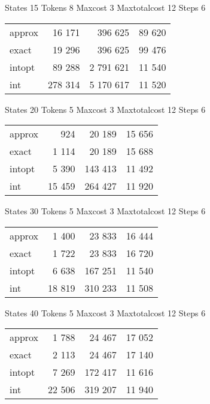 \documentclass[a4paper,11pt]{article}
\begin{document}
\begin{table}
States 15 Tokens 8 Maxcost 3 Maxtotalcost 12 Steps 6 \\
\begin{tabular}{l r r r}
approx & 16 171 & 396 625 & 89 620 \\
exact & 19 296 & 396 625 & 99 476 \\
intopt & 89 288 & 2 791 621 & 11 540 \\
int & 278 314 & 5 170 617 & 11 520 \\
\end{tabular}
\end{table}

\begin{table}
States 20 Tokens 5 Maxcost 3 Maxtotalcost 12 Steps 6 \\
\begin{tabular}{l r r r}
approx & 924 & 20 189 & 15 656 \\
exact & 1 114 & 20 189 & 15 688 \\
intopt & 5 390 & 143 413 & 11 492 \\
int & 15 459 & 264 427 & 11 920 \\
\end{tabular}
\end{table}

\begin{table}
States 30 Tokens 5 Maxcost 3 Maxtotalcost 12 Steps 6 \\
\begin{tabular}{l r r r}
approx & 1 400 & 23 833 & 16 444 \\
exact & 1 722 & 23 833 & 16 720 \\
intopt & 6 638 & 167 251 & 11 540 \\
int & 18 819 & 310 233 & 11 508 \\
\end{tabular}
\end{table}

\begin{table}
States 40 Tokens 5 Maxcost 3 Maxtotalcost 12 Steps 6 \\
\begin{tabular}{l r r r}
approx & 1 788 & 24 467 & 17 052 \\
exact & 2 113 & 24 467 & 17 140 \\
intopt & 7 269 & 172 417 & 11 616 \\
int & 22 506 & 319 207 & 11 940 \\
\end{tabular}
\end{table}
\end{document}
